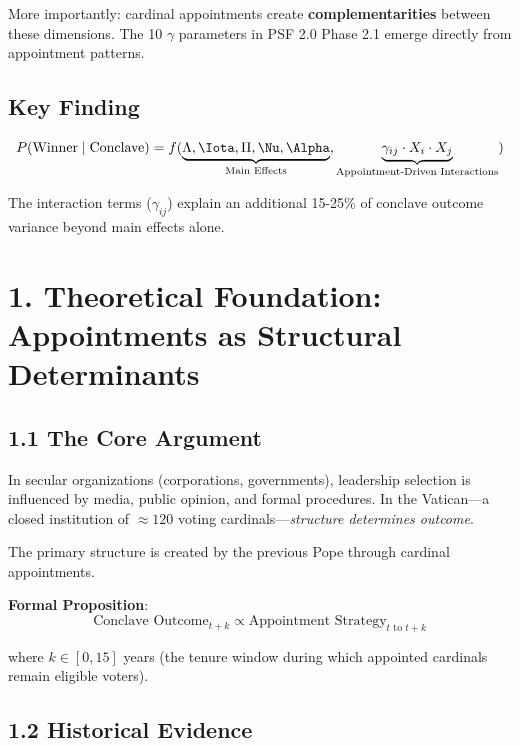 More importantly: cardinal appointments create \textbf{complementarities} between these dimensions. The 10 $\gamma$ parameters in PSF 2.0 Phase 2.1 emerge directly from appointment patterns.

\subsection{Key Finding}

\begin{equation}
P(\text{Winner} \mid \text{Conclave}) = f(\underbrace{\Lambda, \Iota, \Pi, \Nu, \Alpha}_{\text{Main Effects}}, \underbrace{\gamma_{ij} \cdot X_i \cdot X_j}_{\text{Appointment-Driven Interactions}})
\end{equation}

The interaction terms ($\gamma_{ij}$) explain an additional 15-25\% of conclave outcome variance beyond main effects alone.

\section{1. Theoretical Foundation: Appointments as Structural Determinants}

\subsection{1.1 The Core Argument}

In secular organizations (corporations, governments), leadership selection is influenced by media, public opinion, and formal procedures. In the Vatican---a closed institution of $\approx 120$ voting cardinals---\textit{structure determines outcome}.

The primary structure is created by the previous Pope through cardinal appointments.

\textbf{Formal Proposition}:
\begin{equation}
\text{Conclave Outcome}_{t+k} \propto \text{Appointment Strategy}_{t \text{ to } t+k}
\end{equation}

where $k \in [0, 15]$ years (the tenure window during which appointed cardinals remain eligible voters).

\subsection{1.2 Historical Evidence}

